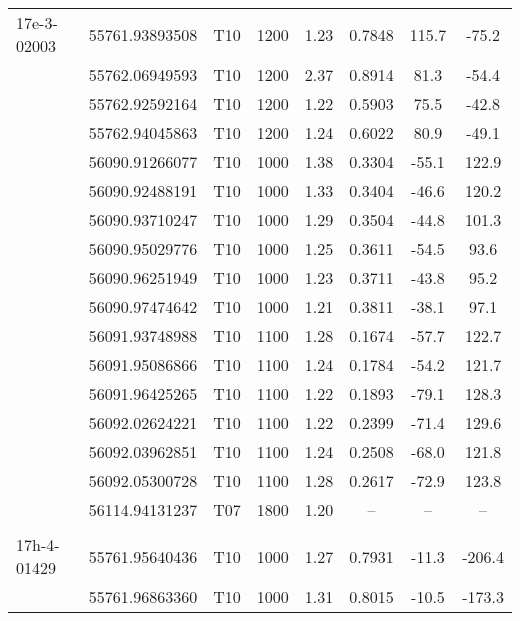 \documentclass[fleqn,usenatbib]{mnras}
\begin{document}
\begin{center}
\begin{longtable}{lccccccc}
17e-3-02003	& 55761.93893508 & T10 & 1200  & 1.23  & 0.7848 & 115.7 & -75.2 \\ %
			& 55762.06949593 & T10 & 1200  & 2.37  & 0.8914 & 81.3 & -54.4 \\ %
			& 55762.92592164 & T10 & 1200  & 1.22  & 0.5903 & 75.5 & -42.8 \\ %
			& 55762.94045863 & T10 & 1200  & 1.24  & 0.6022 & 80.9 & -49.1 \\ %
			& 56090.91266077 & T10 & 1000  & 1.38  & 0.3304 & -55.1 & 122.9 \\ %
			& 56090.92488191 & T10 & 1000  & 1.33  & 0.3404 & -46.6 & 120.2 \\ %
			& 56090.93710247 & T10 & 1000  & 1.29  & 0.3504 & -44.8 & 101.3 \\ %
			& 56090.95029776 & T10 & 1000  & 1.25  & 0.3611 & -54.5 & 93.6 \\ %
			& 56090.96251949 & T10 & 1000  & 1.23  & 0.3711 & -43.8 & 95.2 \\ %
			& 56090.97474642 & T10 & 1000  & 1.21  & 0.3811 & -38.1 & 97.1 \\ %
			& 56091.93748988 & T10 & 1100  & 1.28  & 0.1674 & -57.7 & 122.7 \\ %
			& 56091.95086866 & T10 & 1100  & 1.24  & 0.1784 & -54.2 & 121.7 \\ %
			& 56091.96425265 & T10 & 1100  & 1.22  & 0.1893 & -79.1 & 128.3 \\ %
			& 56092.02624221 & T10 & 1100  & 1.22  & 0.2399 & -71.4 & 129.6 \\ %
			& 56092.03962851 & T10 & 1100  & 1.24  & 0.2508 & -68.0 & 121.8 \\ %
			& 56092.05300728 & T10 & 1100  & 1.28  & 0.2617 & -72.9 & 123.8 \\ %
			& 56114.94131237 & T07 & 1800  & 1.20  & -- & -- & -- \\ %
\\  [-2ex]
17h-4-01429	& 55761.95640436 & T10 & 1000  & 1.27  & 0.7931 & -11.3 & -206.4 \\ %
			& 55761.96863360 & T10 & 1000  & 1.31  & 0.8015 & -10.5 & -173.3 \\ %

\end{longtable}
\end{center}
\end{document}
